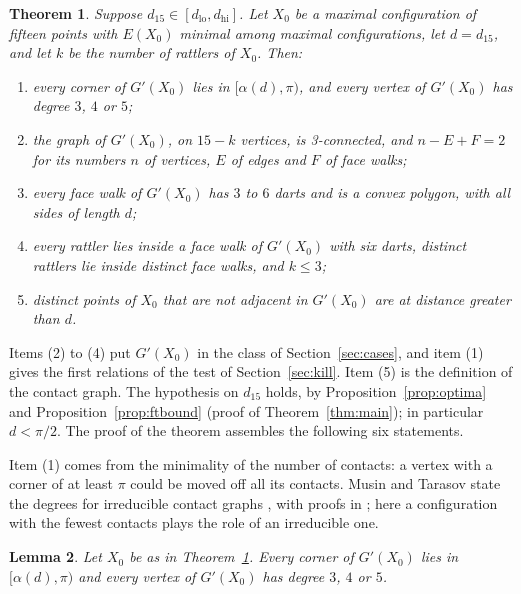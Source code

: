 \documentclass[12pt]{amsart}
\newtheorem{theorem}{Theorem}[section]
\newtheorem{lemma}[theorem]{Lemma}
\theoremstyle{definition}
\theoremstyle{plain}
\theoremstyle{definition}
\newcommand{\dlo}{d_{\mathrm{lo}}}
\newcommand{\dhi}{d_{\mathrm{hi}}}
\newcommand{\leanmap}[1]{\ignorespaces}
\newcommand{\mapnote}[1]{\ignorespaces}
\begin{document}
\begin{theorem}\label{thm:structure}\leanmap{Tammes15.structured_of_min, Tammes15.structure_theorem, Tammes15.exists_contact_of_isGreatest, Tammes15.Geom.rattlers_in_hexagons_proof}\mapnote{items (1) to (4), for $d_{15}$ in any interval $[a,b]\subseteq[d_{lo},d_{hi}]$ with $7a>2\pi$ and $\alpha(b)<2\pi/5$}
Suppose $d_{15}\in[\dlo,\dhi]$. Let $X_0$ be a maximal configuration of fifteen points with $E(X_0)$ minimal among maximal configurations, let $d=d_{15}$, and let $k$ be the number of rattlers of $X_0$. Then:
\begin{enumerate}
\item every corner of $G'(X_0)$ lies in $[\alpha(d),\pi)$, and every vertex of $G'(X_0)$ has degree $3$, $4$ or $5$;
\item the graph of $G'(X_0)$, on $15-k$ vertices, is 3-connected, and $n-E+F=2$ for its numbers $n$ of vertices, $E$ of edges and $F$ of face walks;
\item every face walk of $G'(X_0)$ has $3$ to $6$ darts and is a convex polygon, with all sides of length $d$;
\item every rattler lies inside a face walk of $G'(X_0)$ with six darts, distinct rattlers lie inside distinct face walks, and $k\le3$;
\item distinct points of $X_0$ that are not adjacent in $G'(X_0)$ are at distance greater than $d$.
\end{enumerate}
\end{theorem}

Items (2) to (4) put $G'(X_0)$ in the class of Section~\ref{sec:cases}, and item (1) gives the first relations of the test of Section~\ref{sec:kill}. Item (5) is the definition of the contact graph. The hypothesis on $d_{15}$ holds, by Proposition~\ref{prop:optima} and Proposition~\ref{prop:ftbound} (proof of Theorem~\ref{thm:main}); in particular $d<\pi/2$. The proof of the theorem assembles the following six statements.

Item (1) comes from the minimality of the number of contacts: a vertex with a corner of at least $\pi$ could be moved off all its contacts. Musin and Tarasov state the degrees for irreducible contact graphs \cite[Propositions~3.2 and~3.3]{MT13}, with proofs in \cite{Dan}; here a configuration with the fewest contacts plays the role of an irreducible one.

\begin{lemma}\label{lem:minimal}\leanmap{Tammes15.lemma_minimal, Tammes15.alpha_le_corner, Tammes15.contactCount_lt_of_shift}\mapnote{for every $d\in(0,\pi/2)$ and fifteen points with the fewest contacts among those at pairwise distance at least $d$}
Let $X_0$ be as in Theorem~\ref{thm:structure}. Every corner of $G'(X_0)$ lies in $[\alpha(d),\pi)$ and every vertex of $G'(X_0)$ has degree $3$, $4$ or $5$.
\end{lemma}
\end{document}
